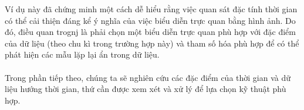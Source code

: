 Ví dụ này đã chứng minh một cách dễ hiểu rằng việc quan sát đặc tính thời gian có thể cải thiện đáng kể ý nghĩa của việc biểu diễn trực quan bằng hình ảnh. Do đó, điều quan trognj là phải chọn một biểu diễn trực quan phù hợp với đặc điểm của dữ liệu (theo chu kì trong trường hợp này) và tham số hóa phù hợp để có thể phát hiện các mẫu lặp lại ẩn trong dữ liệu. 
\\ \\
Trong phần tiếp theo, chúng ta sẽ nghiên cứu các đặc điểm của thời gian và dữ liệu hướng thời gian, thứ cần được xem xét và xử lý để lựa chọn kỹ thuật phù hợp.